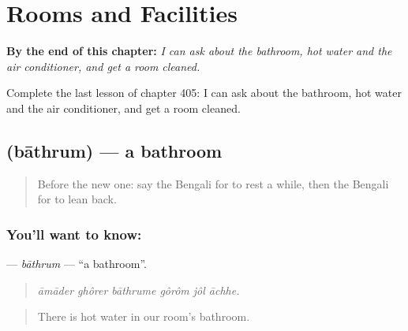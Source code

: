 
\chapter{Rooms and Facilities}
\label{ch:bn-rooms-and-facilities}

\begin{chapteropening}
\textbf{By the end of this chapter:} \emph{I can ask about the bathroom, hot water and the air conditioner, and get a room cleaned.}

Complete the last lesson of chapter 405: I can ask about the bathroom, hot water and the air conditioner, and get a room cleaned.
\end{chapteropening}

\section[\texorpdfstring{\bn{বাথরুম} (bāthrum)}{বাথরুম (bāthrum)}]{ (bāthrum) — a bathroom}

\label{lesson:BN-C405-bathrum}



\begin{quote}
Before the new one: say the Bengali for to rest a while, then the Bengali for to lean back.
\end{quote}

\subsection*{You'll want to know: }
\textbf{} — \emph{bāthrum} — \textquotedblleft{}a bathroom\textquotedblright{}.

\begin{quote}
     
\end{quote}

\begin{quote}
\emph{āmāder ghôrer bāthrume gôrôm jôl āchhe.}
\end{quote}

\begin{quote}
There is hot water in our room's bathroom.
\end{quote}

